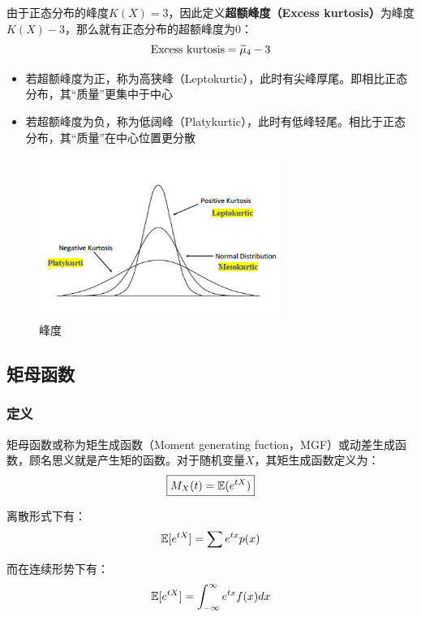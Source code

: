 \documentclass[11pt]{article}
\begin{document}
由于正态分布的峰度$K(X)=3$，因此定义\textbf{超额峰度（Excess kurtosis）}为峰度$K(X)-3$，那么就有正态分布的超额峰度为$0$：
\begin{equation*}
    \text{Excess kurtosis} = \widetilde{\mu}_4-3
\end{equation*}
\begin{itemize}
    \item 若超额峰度为正，称为高狭峰（Leptokurtic），此时有尖峰厚尾。即相比正态分布，其“质量”更集中于中心
    \item 若超额峰度为负，称为低阔峰（Platykurtic），此时有低峰轻尾。相比于正态分布，其“质量”在中心位置更分散
\end{itemize}

\begin{figure}[H]
    \centering
    \includegraphics[width=0.7\textwidth]{fig/kurtosis.png}
    \caption{峰度}
    \label{fig:kurt}
\end{figure}

\subsection{矩母函数}

\subsubsection{定义}

矩母函数或称为矩生成函数（Moment generating fuction，MGF）或动差生成函数，顾名思义就是产生矩的函数。对于随机变量$X$，其矩生成函数定义为：
\begin{equation*}
    \boxed{
        M_X(t) = \mathbb{E}(e^{tX})
    }
\end{equation*}

离散形式下有：
\begin{equation*}
    \mathbb{E}[e^{tX}] = \sum e^{tx} p(x)
\end{equation*}

而在连续形势下有：
\begin{equation*}
    \mathbb{E}[e^{tX}] = \int_{-\infty}^{\infty} e^{tx} f(x) dx
\end{equation*}
\end{document}
